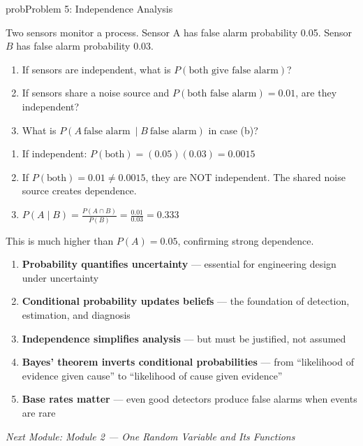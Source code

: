 \begin{PSbox}[unbreakable]{prob}{Problem 5: Independence Analysis}

Two sensors monitor a process. Sensor A has false alarm probability 0.05. Sensor $B$ has false alarm probability 0.03.

\begin{enumerate}
\def\labelenumi{(\alph{enumi})}
\tightlist
\item
  If sensors are independent, what is $P(\text{both give false alarm})$?
\item
  If sensors share a noise source and $P(\text{both false alarm}) = 0.01$, are they independent?
\item
  What is $P(A\ \text{false alarm}\ \mid B\ \text{false alarm})$ in case (b)?
\end{enumerate}

\PSsolution{} 

\begin{enumerate}
\def\labelenumi{(\alph{enumi})}
\item
  If independent: $P(\text{both}) = (0.05)(0.03) = 0.0015$
\item
  If $P(\text{both}) = 0.01 \ne 0.0015$, they are NOT independent. The shared noise source creates dependence.
\item
  $\displaystyle P(A \mid B) = \frac{P(A \cap B)}{P(B)} = \frac{0.01}{0.03} = 0.333$
\end{enumerate}

This is much higher than $P(A) = 0.05$, confirming strong dependence.

\end{PSbox}


\begin{enumerate}
\def\labelenumi{\arabic{enumi}.}
\tightlist
\item
  \textbf{Probability quantifies uncertainty} — essential for engineering design under uncertainty
\item
  \textbf{Conditional probability updates beliefs} — the foundation of detection, estimation, and diagnosis
\item
  \textbf{Independence simplifies analysis} — but must be justified, not assumed
\item
  \textbf{Bayes’ theorem inverts conditional probabilities} — from ``likelihood of evidence given cause'' to ``likelihood of cause given evidence''
\item
  \textbf{Base rates matter} — even good detectors produce false alarms when events are rare
\end{enumerate}

\emph{Next Module: {Module 2 — One Random Variable and Its Functions}}

